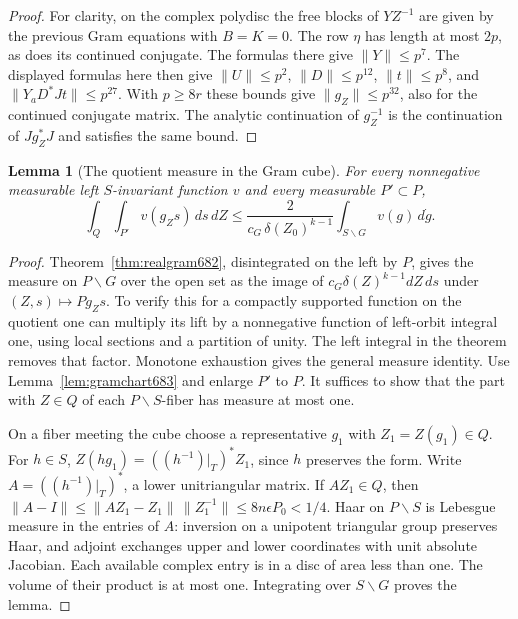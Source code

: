 \documentclass[a4paper,11pt]{article}
\newtheorem{lemma}[proposition]{Lemma}
\theoremstyle{definition}
\theoremstyle{remark}
\numberwithin{equation}{section}
\begin{document}
\begin{proof}
For clarity, on the complex polydisc the free blocks of \(YZ^{-1}\)
are given by the previous Gram equations with \(B=K=0\).
The row \(\eta\) has length at most \(2p\), as does its continued
conjugate. The formulas there give \(\|Y\|\le p^7\).
The displayed formulas here then give \(\|U\|\le p^2\),
\(\|D\|\le p^{12}\), \(\|t\|\le p^8\), and
\(\|Y_aD^*Jt\|\le p^{27}\). With \(p\ge8r\) these bounds give
\(\|g_Z\|\le p^{32}\), also for the continued conjugate matrix.
The analytic continuation of \(g_Z^{-1}\) is the continuation
of \(Jg_Z^*J\) and satisfies the same bound.
\end{proof}

\begin{lemma}[The quotient measure in the Gram cube]
\leavevmode\label{lem:gramquotient683}
For every nonnegative measurable left \(S\)-invariant function
\(v\) and every measurable \(P'\subset P\),
\[
 \int_Q\int_{P'} v(g_Zs)\,ds\,dZ
       \le \frac{2}{c_G\,\delta(Z_0)^{k-1}}
                    \int_{S\backslash G}v(g)\,d\dot g .
\]
\end{lemma}
\begin{proof}
Theorem~\ref{thm:realgram682}, disintegrated on the left by \(P\),
gives the measure on \(P\backslash G\) over the open set as
the image of \(c_G\delta(Z)^{k-1}dZ\,ds\) under
\((Z,s)\mapsto P g_Zs\). To verify this for a compactly
supported function on the quotient one can multiply its lift
by a nonnegative function of left-orbit integral one, using
local sections and a partition of unity. The left integral in
the theorem removes that factor. Monotone exhaustion gives the
general measure identity. Use Lemma~\ref{lem:gramchart683} and
enlarge \(P'\) to \(P\). It suffices to show that the part with
\(Z\in Q\) of each \(P\backslash S\)-fiber has measure at most one.

On a fiber meeting the cube choose a representative \(g_1\) with
\(Z_1=Z(g_1)\in Q\). For \(h\in S\),
\(Z(hg_1)=((h^{-1})|_T)^* Z_1\), since \(h\) preserves the
form. Write \(A=((h^{-1})|_T)^*\), a lower unitriangular matrix.
If \(AZ_1\in Q\), then
\(\|A-I\|\le\|AZ_1-Z_1\|\,\|Z_1^{-1}\|
                 \le 8n\epsilon P_0<1/4\).
Haar on \(P\backslash S\) is Lebesgue measure in the entries
of \(A\): inversion on a unipotent triangular group preserves
Haar, and adjoint exchanges upper and lower coordinates with
unit absolute Jacobian. Each available complex entry is in a
disc of area less than one. The volume of their product is
at most one. Integrating over \(S\backslash G\) proves the lemma.
\end{proof}
\end{document}
